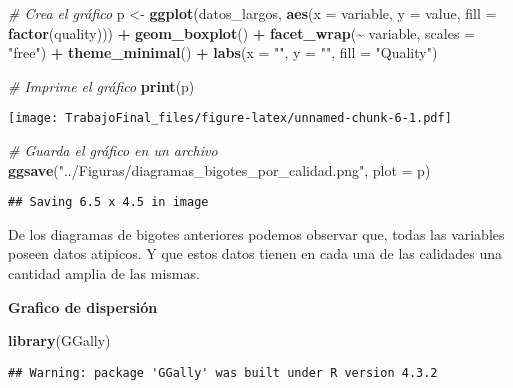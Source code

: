 \documentclass[
]{article}
\newenvironment{Shaded}{\begin{snugshade}}{\end{snugshade}}
\newcommand{\AttributeTok}[1]{\textcolor[rgb]{0.13,0.29,0.53}{#1}}
\newcommand{\CommentTok}[1]{\textcolor[rgb]{0.56,0.35,0.01}{\textit{#1}}}
\newcommand{\FunctionTok}[1]{\textcolor[rgb]{0.13,0.29,0.53}{\textbf{#1}}}
\newcommand{\NormalTok}[1]{#1}
\newcommand{\OtherTok}[1]{\textcolor[rgb]{0.56,0.35,0.01}{#1}}
\newcommand{\SpecialCharTok}[1]{\textcolor[rgb]{0.81,0.36,0.00}{\textbf{#1}}}
\newcommand{\StringTok}[1]{\textcolor[rgb]{0.31,0.60,0.02}{#1}}
\begin{document}
\begin{Shaded}
\begin{Highlighting}[]
\CommentTok{\# Crea el gráfico}
\NormalTok{p }\OtherTok{\textless{}{-}} \FunctionTok{ggplot}\NormalTok{(datos\_largos, }\FunctionTok{aes}\NormalTok{(}\AttributeTok{x =}\NormalTok{ variable, }\AttributeTok{y =}\NormalTok{ value, }\AttributeTok{fill =} \FunctionTok{factor}\NormalTok{(quality))) }\SpecialCharTok{+}
  \FunctionTok{geom\_boxplot}\NormalTok{() }\SpecialCharTok{+}
  \FunctionTok{facet\_wrap}\NormalTok{(}\SpecialCharTok{\textasciitilde{}}\NormalTok{ variable, }\AttributeTok{scales =} \StringTok{"free"}\NormalTok{) }\SpecialCharTok{+}
  \FunctionTok{theme\_minimal}\NormalTok{() }\SpecialCharTok{+}
  \FunctionTok{labs}\NormalTok{(}\AttributeTok{x =} \StringTok{""}\NormalTok{, }\AttributeTok{y =} \StringTok{""}\NormalTok{, }\AttributeTok{fill =} \StringTok{"Quality"}\NormalTok{)}

\CommentTok{\# Imprime el gráfico}
\FunctionTok{print}\NormalTok{(p)}
\end{Highlighting}
\end{Shaded}

\texttt{[image: TrabajoFinal\_files/figure-latex/unnamed-chunk-6-1.pdf]}

\begin{Shaded}
\begin{Highlighting}[]
\CommentTok{\# Guarda el gráfico en un archivo}
\FunctionTok{ggsave}\NormalTok{(}\StringTok{"../Figuras/diagramas\_bigotes\_por\_calidad.png"}\NormalTok{, }\AttributeTok{plot =}\NormalTok{ p)}
\end{Highlighting}
\end{Shaded}

\begin{verbatim}
## Saving 6.5 x 4.5 in image
\end{verbatim}

De los diagramas de bigotes anteriores podemos observar que, todas las
variables poseen datos atipicos. Y que estos datos tienen en cada una de
las calidades una cantidad amplia de las mismas.

\textbf{Grafico de dispersión}

\begin{Shaded}
\begin{Highlighting}[]
\FunctionTok{library}\NormalTok{(GGally)}
\end{Highlighting}
\end{Shaded}

\begin{verbatim}
## Warning: package 'GGally' was built under R version 4.3.2
\end{verbatim}
\end{document}
